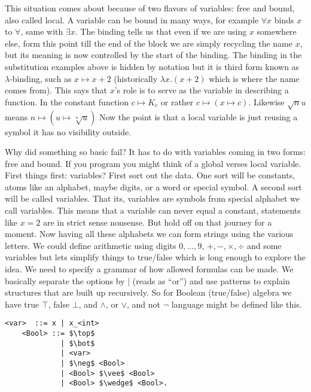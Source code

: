 This situation comes about because of two flavors of variables: free and bound,
also called local.  A variable can be bound in many ways, for example 
$\forall x$ binds $x$ to $\forall$, same with $\exists x$.  The binding tells 
us that even if we are using $x$ somewhere else, form this point till 
the end of the block we are simply recycling the name $x$, but its meaning 
is now controlled by the start of the binding.  The binding in the 
substitution examples above is hidden by notation but it is third form 
known as $\lambda$-binding, such as $x\mapsto x+2$ (historically 
$\lambda x.(x+2)$ which is where the name comes from).  This says that 
$x$'s role is to serve as the variable in describing a function.
In the constant function $c\mapsto K_c$ or rather $c\mapsto (x\mapsto c)$.
Likewise $\sqrt{n}{u}$ means $n\mapsto (u\mapsto \sqrt[n]{u})$
Now the point is that a local variable is just reusing a symbol it has 
no visibility outside.

Why did something so basic fail?  It has to do with variables coming in 
two forms: free and bound.  If you program you might think of a global 
verses local variable.  First things first: variables?
First sort out the data.  One sort will be constants, atoms like an alphabet,
maybe digits, or a word or special symbol. A second sort will be called variables.
That its, variables are symbols from special alphabet we call variables.
This means that a variable can never equal a constant, statements like $x=2$ 
are in strict sense nonsense.  But hold off on that journey for a moment.
Now having all these alphabets we can form strings using the various letters.
We could define arithmetic using digits $0,\ldots, 9$, $+,-,\times,\div$ and some 
variables but lets simplify things to true/false which is long enough to 
explore the idea.  We need to specify a grammar of how allowed formulas can 
be made.  We basically separate the options by $\mid$ (reads as ``or'')
and use patterns to explain structures that are built up recursively.
So for Boolean (true/false) algebra we have true $\top$, false $\bot$, 
and $\wedge$, or $\vee$, and not $\neg$ language might be defined like this.
\newpage    
\begin{lstfloat}
\begin{lstlisting}[mathescape]
    <var>  ::= x | x_<int>
    <Bool> ::= $\top$ 
             | $\bot$ 
             | <var>
             | $\neg$ <Bool> 
             | <Bool> $\vee$ <Bool> 
             | <Bool> $\wedge$ <Bool>.
\end{lstlisting}
\end{lstfloat}




